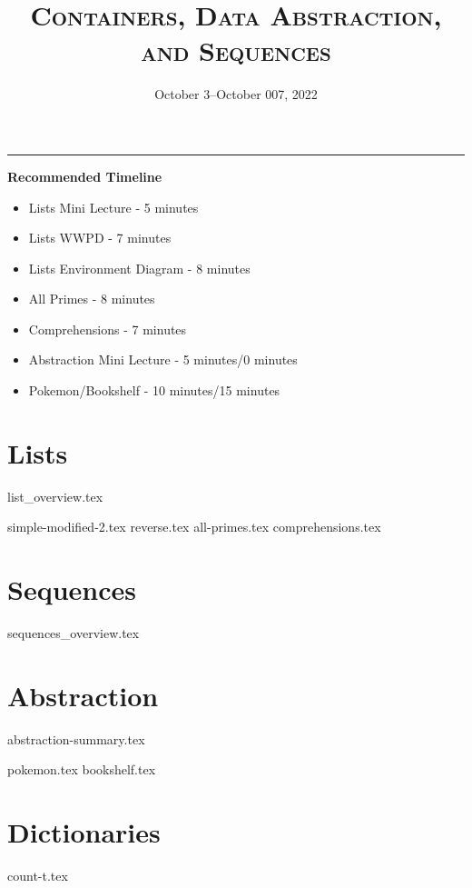 \documentclass{exam}
\title{\textsc{Containers, Data Abstraction, and Sequences}}
\date{October 3--October 007, 2022}
\begin{document}
\maketitle
\rule{\textwidth}{0.15em}
\fontsize{12}{15}\selectfont


\begin{guide}
    \textbf{Recommended Timeline}
    \begin{itemize}
        \item Lists Mini Lecture - 5 minutes
        \item Lists WWPD - 7 minutes
        \item Lists Environment Diagram - 8 minutes
        \item All Primes - 8 minutes
        \item Comprehensions - 7 minutes
        \item Abstraction Mini Lecture - 5 minutes/0 minutes
        \item Pokemon/Bookshelf - 10 minutes/15 minutes
    \end{itemize}
\end{guide}

\section{Lists}
{list_overview.tex}
\begin{questions}
    {simple-modified-2.tex}
    {reverse.tex}
    \newpage %
    {all-primes.tex}
    {comprehensions.tex}
\end{questions}

\newpage
\section{Sequences}
{sequences_overview.tex}


\newpage
\section{Abstraction}
{abstraction-summary.tex}
\begin{questions}
    {pokemon.tex}
    {bookshelf.tex}
\end{questions}

\newpage
\section{Dictionaries}
\begin{questions}
    {count-t.tex}
\end{questions}
\end{document}
